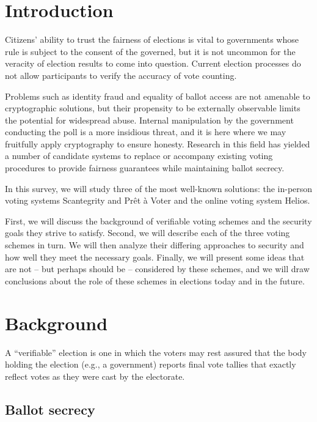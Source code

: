 \documentclass[10pt]{article}
\newcommand{\preta}{Pr\^{e}t \`{a}}
\newcommand{\pv}{\preta{} Voter}
\begin{document}
\begin{multicols}{2}

\section{Introduction}

Citizens' ability to trust the fairness of elections is vital to governments whose rule is subject
to the consent of the governed, but it is not uncommon for the veracity of election results to come
into question.  Current election processes do not allow participants to verify the accuracy of vote
counting.

Problems such as identity fraud and equality of ballot access are not amenable to cryptographic
solutions, but their propensity to be externally observable limits the potential for widespread
abuse.  Internal manipulation by the government conducting the poll is a more insidious threat, and
it is here where we may fruitfully apply cryptography to ensure honesty. Research in this field has
yielded a number of candidate systems to replace or accompany existing voting procedures to provide
fairness guarantees while maintaining ballot secrecy.

In this survey, we will study three of the most well-known solutions: the in-person voting systems
Scantegrity and \pv{} and the online voting system Helios.

First, we will discuss the background of verifiable voting schemes and the security goals they
strive to satisfy. Second, we will describe each of the three voting schemes in turn. We will then
analyze their differing approaches to security and how well they meet the necessary goals. Finally,
we will present some ideas that are not -- but perhaps should be -- considered by these schemes, and
we will draw conclusions about the role of these schemes in elections today and in the future.

\section{Background}

A ``verifiable'' election is one in which the voters may rest assured that the body holding the
election (e.g., a government) reports final vote tallies that exactly reflect votes as they were
cast by the electorate.

\subsection{Ballot secrecy}


\end{multicols}
\end{document}
